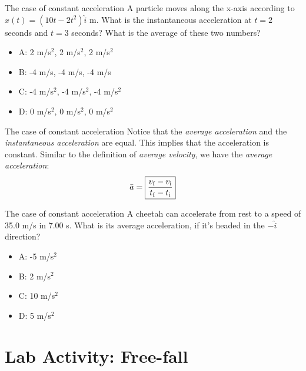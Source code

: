 \documentclass{beamer}
\begin{document}
\begin{frame}{The case of constant acceleration}
A particle moves along the x-axis according to $x(t) = (10t-2t^2)\hat{i}$ m.  What is the instantaneous acceleration
at $t=2$ seconds and $t=3$ seconds? What is the average of these two numbers?
\begin{itemize}
\item A: 2 m/s$^2$, 2 m/s$^2$, 2 m/s$^2$
\item B: -4 m/s, -4 m/s, -4 m/s
\item C: -4 m/s$^2$, -4 m/s$^2$, -4 m/s$^2$
\item D: 0 m/s$^2$, 0 m/s$^2$, 0 m/s$^2$
\end{itemize}
\end{frame}

\begin{frame}{The case of constant acceleration}
Notice that the \textit{average acceleration} and the \textit{instantaneous acceleration} are equal.  This implies that the acceleration is constant.  Similar to the definition of \textit{average velocity}, we have the \textit{average acceleration}:\\
\begin{equation}
\bar{a} = \boxed{\frac{v_{\rm f} - v_{\rm i}}{t_{\rm f} - t_{\rm i}}}
\end{equation}
\end{frame}

\begin{frame}{The case of constant acceleration}
A cheetah can accelerate from rest to a speed of 35.0 m/s in 7.00 s. What is its average acceleration, if it's headed in the $-\hat{i}$ direction?
\begin{itemize}
\item A: -5 m/s$^2$
\item B: 2 m/s$^2$
\item C: 10 m/s$^2$
\item D: 5 m/s$^2$
\end{itemize}
\end{frame}

\section{Lab Activity: Free-fall}
\end{document}
